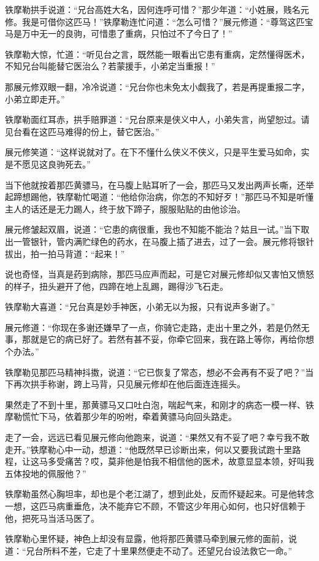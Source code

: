 \documentclass[12pt,oneside]{book}
\begin{document}
铁摩勒拱手说道：``兄台高姓大名，因何连呼可惜？''那少年道：``小姓展，贱名元修。我是可借你这匹马！''铁摩勒连忙问道：``怎么可惜？''展元修道：``尊驾这匹宝马是万中无一的良驹，可惜患了重病，只怕过不了今日了！''

铁摩勒大惊，忙道：``听见台之言，既然能一眼看出它患有重病，定然懂得医术，不知兄台叫能替它医治么？若蒙援手，小弟定当重报！''

那展元修双眼一翻，冷冷说道：``兄台你也未免太小觑我了，若是再提重报二字，小弟立即走开。''

铁摩勒面红耳赤，拱手赔罪道：``兄台原来是侠义中人，小弟失言，尚望恕过。请见台看在这匹马难得的份上，替它医治。''

展元修笑道：``这样说就对了。在下不懂什么侠义不侠义，只是平生爱马如命，实是不愿见这良驹死去。''

当下他就按着那匹黄骠马，在马腹上贴耳听了一会，那匹马又发出两声长嘶，还举起蹄想踢他，铁摩勒忙喝道：``他给你治病，你怎的不知好歹！''那匹马不知是听懂主人的话还是无力踢人，终于放下蹄子，服服贴贴的由他诊治。

展元修皱起双眉，说道：``它患的病很重，我也不知能不能治？姑且一试。''当下取出一管银针，管内满贮绿色的药水，在马腹上插了进去，过了一会。展元修将银针拔出，拍一拍马背道：``起来！''

说也奇怪，当真是药到病除，那匹马应声而起，可是它对展元修却似又害怕又愤怒的样子，扭头避开了他，四蹄在地上乱踢，踢得沙飞石走。

铁摩勒大喜道：``兄台真是妙手神医，小弟无以为报，只有说声多谢了。''

展元修道：``你现在多谢还嫌早了一点，你骑它走路，走出十里之外，若是仍然无事，那就是它的病已好了。若然有甚不妥，你牵它回来，我在路上等你，再给你想个办法。''

铁摩勒见那匹马精神抖擞，说道：``它已恢复了常态，想必不会再有不妥了吧？''当下再次拱手称谢，跨上马背，只见展元修却在他后面连连摇头。

果然走了不到十里，那黄骠马又口吐白泡，喘起气来，和刚才的病态一模一样、铁摩勒慌忙下马，依着那少年的吩咐，牵着黄骠马向回头路走。

走了一会，远远已看见展元修向他跑来，说道：``果然又有不妥了吧？幸亏我不敢走开。''铁摩勒心中一动，想道：``他既然早已诊断出来，何以又要我试跑十里路程，让这马多受痛苦？哎，莫非他是怕我不相信他的医术，故意显显本领，好叫我五体投地的佩服他？''

铁摩勒虽然心胸坦率，却也是个老江湖了，想到此处，反而怀疑起来。可是他转念一想，这匹马病重垂危，决不能弃它不顾，不管这少年用心如何，也只好信赖于他，把死马当活马医了。

铁摩勒心里怀疑，神色上却没有显露，他将那匹黄骠马牵到展元修的面前，说道：``兄台所料不差，它走了十里果然便走不动了。还望兄台设法救它一命。''
\end{document}
